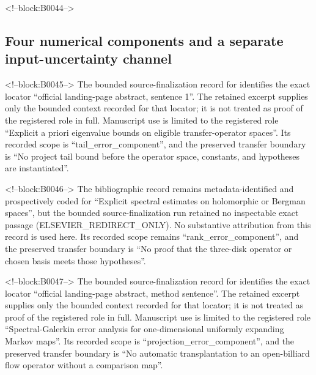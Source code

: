 \documentclass[11pt,a4paper]{article}
\begin{document}
<!--block:B0044-->
\subsection{Four numerical components and a separate input-uncertainty channel}

<!--block:B0045-->
The bounded source-finalization record for \citep{P30-S19} identifies
the exact locator ``official landing-page abstract, sentence 1''.  The retained excerpt supplies only the
bounded context recorded for that locator; it is not treated as proof of the
registered role in full.  Manuscript use is limited to the registered role ``Explicit a priori eigenvalue bounds on eligible transfer-operator spaces''.
Its recorded scope is ``tail\_error\_component'', and the preserved
transfer boundary is ``No project tail bound before the operator space, constants, and hypotheses are instantiated''.

<!--block:B0046-->
The bibliographic record \citep{P30-S20} remains metadata-identified and
prospectively coded for ``Explicit spectral estimates on holomorphic or Bergman spaces'', but the bounded source-finalization
run retained no inspectable exact passage (ELSEVIER\_REDIRECT\_ONLY).  No substantive
attribution from this record is used here.  Its recorded scope remains
``rank\_error\_component'', and the preserved transfer boundary is ``No proof that the three-disk operator or chosen basis meets those hypotheses''.

<!--block:B0047-->
The bounded source-finalization record for \citep{P30-S21} identifies
the exact locator ``official landing-page abstract, method sentence''.  The retained excerpt supplies only the
bounded context recorded for that locator; it is not treated as proof of the
registered role in full.  Manuscript use is limited to the registered role ``Spectral-Galerkin error analysis for one-dimensional uniformly expanding Markov maps''.
Its recorded scope is ``projection\_error\_component'', and the preserved
transfer boundary is ``No automatic transplantation to an open-billiard flow operator without a comparison map''.
\end{document}

